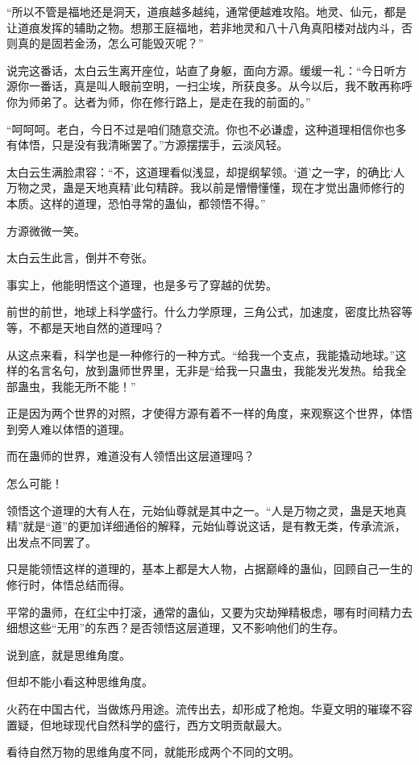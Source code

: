\begin{this_body}
“所以不管是福地还是洞天，道痕越多越纯，通常便越难攻陷。地灵、仙元，都是让道痕发挥的辅助之物。想那王庭福地，若非地灵和八十八角真阳楼对战内斗，否则真的是固若金汤，怎么可能毁灭呢？”

说完这番话，太白云生离开座位，站直了身躯，面向方源。缓缓一礼：“今日听方源你一番话，真是叫人眼前空明，一扫尘埃，所获良多。从今以后，我不敢再称呼你为师弟了。达者为师，你在修行路上，是走在我的前面的。”

“呵呵呵。老白，今日不过是咱们随意交流。你也不必谦虚，这种道理相信你也多有体悟，只是没有我清晰罢了。”方源摆摆手，云淡风轻。

太白云生满脸肃容：“不，这道理看似浅显，却提纲挈领。‘道’之一字，的确比‘人万物之灵，蛊是天地真精’此句精辟。我以前是懵懵懂懂，现在才觉出蛊师修行的本质。这样的道理，恐怕寻常的蛊仙，都领悟不得。”

方源微微一笑。

太白云生此言，倒并不夸张。

事实上，他能明悟这个道理，也是多亏了穿越的优势。

前世的前世，地球上科学盛行。什么力学原理，三角公式，加速度，密度比热容等等，不都是天地自然的道理吗？

从这点来看，科学也是一种修行的一种方式。“给我一个支点，我能撬动地球。”这样的名言名句，放到蛊师世界里，无非是“给我一只蛊虫，我能发光发热。给我全部蛊虫，我能无所不能！”

正是因为两个世界的对照，才使得方源有着不一样的角度，来观察这个世界，体悟到旁人难以体悟的道理。

而在蛊师的世界，难道没有人领悟出这层道理吗？

怎么可能！

领悟这个道理的大有人在，元始仙尊就是其中之一。“人是万物之灵，蛊是天地真精”就是“道”的更加详细通俗的解释，元始仙尊说这话，是有教无类，传承流派，出发点不同罢了。

只是能领悟这样的道理的，基本上都是大人物，占据巅峰的蛊仙，回顾自己一生的修行时，体悟总结而得。

平常的蛊师，在红尘中打滚，通常的蛊仙，又要为灾劫殚精极虑，哪有时间精力去细想这些“无用”的东西？是否领悟这层道理，又不影响他们的生存。

说到底，就是思维角度。

但却不能小看这种思维角度。

火药在中国古代，当做炼丹用途。流传出去，却形成了枪炮。华夏文明的璀璨不容置疑，但地球现代自然科学的盛行，西方文明贡献最大。

看待自然万物的思维角度不同，就能形成两个不同的文明。


\end{this_body}
